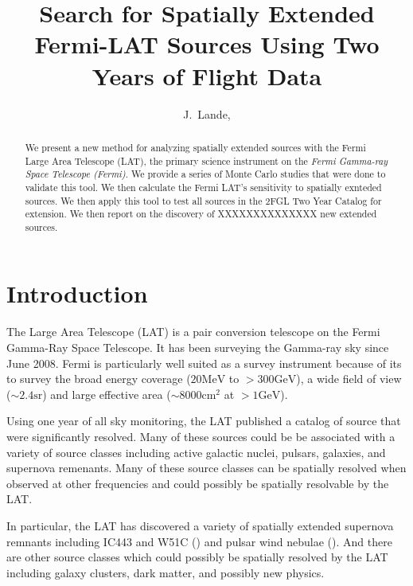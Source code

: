 \documentclass[preprint]{aastex}
\newcommand{\mev}{\text{MeV}\xspace}
\newcommand{\gev}{\text{GeV}\xspace}
\newcommand{\sr}{\text{sr}\xspace}
\newcommand{\cm}{\text{cm}\xspace}
\begin{document}
\title{Search for Spatially Extended Fermi-LAT Sources Using Two Years of Flight
Data}

\author{
J.~Lande, 
}


\begin{abstract}
We present a new method for analyzing spatially extended sources with
the Fermi Large Area Telescope (LAT), the primary science instrument
on the {\em Fermi Gamma-ray Space Telescope (Fermi)}.  We provide a
series of Monte Carlo studies that were done to validate this tool.
We then calculate the Fermi LAT's sensitivity to spatially exnteded
sources.
We then apply this tool to test all sources in the 2FGL Two Year Catalog
for extension.\cite{2FGL} We then report on the discovery of XXXXXXXXXXXXXX new
extended sources.
\end{abstract}

\section{Introduction}


The Large Area Telescope (LAT) is a pair conversion telescope on the
Fermi Gamma-Ray Space Telescope. It has been surveying the Gamma-ray
sky since June 2008.  Fermi is particularly well suited as a survey
instrument because of its to survey the broad energy coverage ($20\mev$
to $>300\gev$), a wide field of view ($\sim 2.4 \sr$) and large effective
area ($\sim 8000 \cm^2$ at $>1\gev$).

Using one year of all sky monitoring, the LAT published a catalog of
source that were significantly resolved.  Many of these sources could
be be associated with a variety of source classes including active
galactic nuclei, pulsars, galaxies, and supernova remenants.  Many of
these source classes can be spatially resolved when observed at other
frequencies and could possibly be spatially resolvable by the LAT.

In particular, the LAT has discovered a variety of spatially extended
supernova remnants including IC443 and W51C (\cite{IC443,W51C}) and pulsar
wind nebulae (\cite{MSH15-52,VelaX}). And there are other source classes
which could possibly be spatially resolved by the LAT including galaxy
clusters, dark matter, and possibly new physics.
\end{document}
